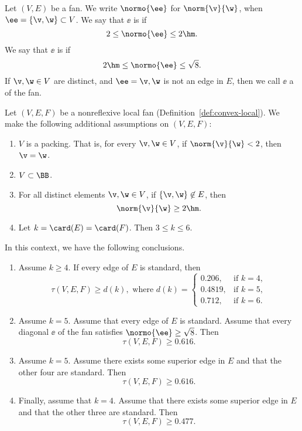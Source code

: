 \begin{definition} Let $(V,E)$ be a fan.  
We write $\normo{\ee}$ for $\norm{\v}{\w}$, when $\ee=\{\v,\w\}\subset V$.
We say that  $\ee$ is  if
\[
2\le \normo{\ee}\le2\hm.
\]
We say that  $\ee$ is  if
\[
2\hm\le \normo{\ee}\le\sqrt{8}.
\]
If $\v,\w\in V$ are distinct, and $\ee={\v,\w}$ is not an edge in $E$, then
we call $\ee$ a  of the fan.
\end{definition}


\begin{theorem}
Let $(V,E,F)$ be a nonreflexive local fan (Definition~\ref{def:convex-local}).
We make the following additional
assumptions on $(V,E,F)$:
\begin{enumerate}
\item {} $V$ is a packing.  That is, for every $\v,\w\in
V$, if $\norm{\v}{\w}<2$, then $\v=\w$.
\item {} $V\subset \BB$.
\item {} For all distinct elements $\v,\w\in V$, if
$\{\v,\w\}\not\in E$, then 
\[ 
\norm{\v}{\w}\ge 2\hm.
\] 
\item {} 
Let   $k=\card(E)=\card(F)$.  Then $3\le k \le 6$.
\end{enumerate}
\label{lemma:empty-d}
In this context, we have the following conclusions.
\begin{enumerate}
\item Assume $k\ge 4$.  If  every edge of $E$ is standard, then
\[ 
\tau(V,E,F) \ge d (k), \text{ where } d(k) =
\begin{cases}
  0.206,&\text{if }k=4,\\
  0.4819,&\text{if }k=5,\\
  0.712,&\text{if }k=6.
\end{cases}
\] 
\item Assume $k=5$.  Assume that every edge of $E$ is standard.
Assume that every diagonal $\ee$ of the fan satisfies $\normo{\ee}\ge\sqrt{8}$.
Then 
\[
\tau(V,E,F)\ge 0.616.
\]
\item Assume $k=5$.  Assume there exists some superior edge in $E$ 
and that the other four are standard.  Then 
\[
\tau(V,E,F)\ge 0.616.
\]
\item Finally, assume that $k=4$.  Assume that there exists some superior
 edge in $E$ and that the other three are standard.  Then
\[
\tau(V,E,F)\ge 0.477.
\]
\end{enumerate}
\end{theorem}

